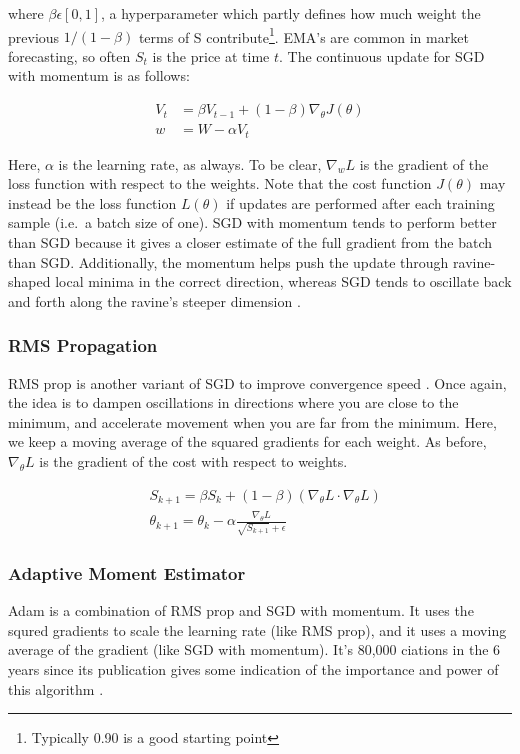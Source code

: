 \noindent where $ \beta \epsilon [0,1]$, a hyperparameter which partly defines how much weight the previous $ 1/(1-\beta) $ terms of S contribute\footnote{Typically 0.90 is a good starting point}. EMA's are common in market forecasting, so often $ S_t $  is the price at time $ t $. The continuous update for SGD with momentum is as follows:

\begin{align}
    V_t &= \beta V_{t-1}  + \left( 1 - \beta \right) \nabla_\theta J \left( \theta \right)\\
    w &= W - \alpha V_t
\end{align}


Here, $ \alpha $  is the learning rate, as always. To be clear, $\nabla_w L$ is the gradient of the loss function with respect to the weights. Note that the cost function $ J(\theta) $ may instead be the loss function $ L(\theta) $ if updates are performed after each training sample (i.e.~a batch size of one). SGD with momentum tends to perform better than SGD because it gives a closer estimate of the full gradient from the batch than SGD. Additionally, the momentum helps push the update through ravine-shaped local minima in the correct direction, whereas SGD tends to oscillate back and forth along the ravine's steeper dimension \cite{qian1999momentum}.

\subsubsection{RMS Propagation}
RMS prop is another variant of SGD to improve convergence speed \cite{improving-rprop} \cite{adagrad} \cite{2017marginal-adagrad}. Once again, the idea is to dampen oscillations in directions where you are close to the minimum, and accelerate movement when you are far from the minimum. Here, we keep a moving average of the squared gradients for each weight. As before, $\nabla_\theta L$ is the gradient of the cost with respect to weights.

\begin{align}
    \label{eqn:RMS_Prop}
    & S_{k+1} = \beta S_k + (1 - \beta)(\nabla_\theta L \cdot \nabla_\theta L) \\
    & \theta_{k+1} = \theta_k - \alpha \frac{\nabla_\theta L}{\sqrt{S_{k+1}} + \epsilon}
\end{align}

\subsubsection{Adaptive Moment Estimator}
Adam is a combination of RMS prop and SGD with momentum. It uses the squred gradients to scale the learning rate (like RMS prop), and it uses a moving average of the gradient (like SGD with momentum). It's 80,000 ciations in the 6 years since its publication gives some indication of the importance and power of this algorithm \cite{orig-ADAM-paper}.

